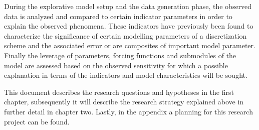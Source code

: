During the explorative model setup and the data generation phase, the
observed data is analyzed and compared to certain indicator parameters
in order to explain the observed phenomena. These indicators have
previously been found to characterize the significance of certain
modelling parameters \citep{Shin2004} of a discretization scheme and the
associated error or are composites of important model parameter. Finally
the leverage of parameters, forcing functions and submodules of the
model are assessed based on the observed sensitivity for which a
possible explanation in terms of the indicators and model
characteristics will be sought.

This document describes the research questions and hypotheses in the
first chapter, subsequently it will describe the research strategy
explained above in further detail in chapter two. Lastly, in the
appendix a planning for this research project can be found.
